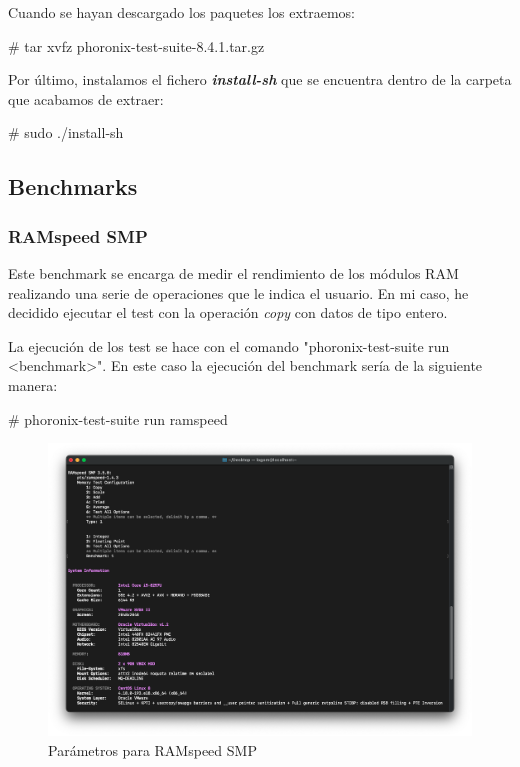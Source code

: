 Cuando se hayan descargado los paquetes los extraemos:
\begin{tcolorbox}[colback=black!10, halign=left]
    \# tar xvfz phoronix-test-suite-8.4.1.tar.gz
\end{tcolorbox}

Por último, instalamos el fichero \textbf{\emph{install-sh}} que se encuentra dentro de la carpeta que acabamos de extraer:
\begin{tcolorbox}[colback=black!10, halign=left]
    \# sudo ./install-sh
\end{tcolorbox}

\subsection{Benchmarks}
\subsubsection{RAMspeed SMP}
Este benchmark se encarga de medir el rendimiento de los módulos RAM realizando una serie de operaciones que le indica el usuario. En mi caso,
he decidido ejecutar el test con la operación \emph{copy} con datos de tipo entero.

La ejecución de los test se hace con el comando "phoronix-test-suite run <benchmark>". En este caso la ejecución del benchmark sería de la siguiente manera:
\begin{tcolorbox}[colback=black!10, halign=left]
    \# phoronix-test-suite run ramspeed
\end{tcolorbox}

\begin{figure}[H]
    \centering
    \includegraphics[scale=0.36]{images/ramspeed_parametros.png}
    \caption{Parámetros para RAMspeed SMP}
    \label{fig:ramspeed_parametros}
\end{figure}

